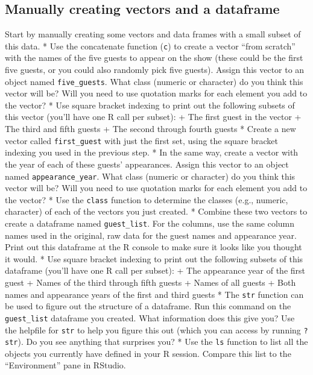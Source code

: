 \documentclass[]{book}
\theoremstyle{definition}
\theoremstyle{definition}
\theoremstyle{definition}
\theoremstyle{remark}
\begin{document}
\subsection{Manually creating vectors and a
dataframe}\label{manually-creating-vectors-and-a-dataframe}

Start by manually creating some vectors and data frames with a small
subset of this data. * Use the concatenate function (\texttt{c}) to
create a vector ``from scratch'' with the names of the five guests to
appear on the show (these could be the first five guests, or you could
also randomly pick five guests). Assign this vector to an object named
\texttt{five\_guests}. What class (numeric or character) do you think
this vector will be? Will you need to use quotation marks for each
element you add to the vector? * Use square bracket indexing to print
out the following subsets of this vector (you'll have one R call per
subset): + The first guest in the vector + The third and fifth guests +
The second through fourth guests * Create a new vector called
\texttt{first\_guest} with just the first set, using the square bracket
indexing you used in the previous step. * In the same way, create a
vector with the year of each of these guests' appearances. Assign this
vector to an object named \texttt{appearance\_year}. What class (numeric
or character) do you think this vector will be? Will you need to use
quotation marks for each element you add to the vector? * Use the
\texttt{class} function to determine the classes (e.g., numeric,
character) of each of the vectors you just created. * Combine these two
vectors to create a dataframe named \texttt{guest\_list}. For the
columns, use the same column names used in the original, raw data for
the guest names and appearance year. Print out this dataframe at the R
console to make sure it looks like you thought it would. * Use square
bracket indexing to print out the following subsets of this dataframe
(you'll have one R call per subset): + The appearance year of the first
guest + Names of the third through fifth guests + Names of all guests +
Both names and appearance years of the first and third guests * The
\texttt{str} function can be used to figure out the structure of a
dataframe. Run this command on the \texttt{guest\_list} dataframe you
created. What information does this give you? Use the helpfile for
\texttt{str} to help you figure this out (which you can access by
running \texttt{?str}). Do you see anything that surprises you? * Use
the \texttt{ls} function to list all the objects you currently have
defined in your R session. Compare this list to the ``Environment'' pane
in RStudio.
\end{document}

